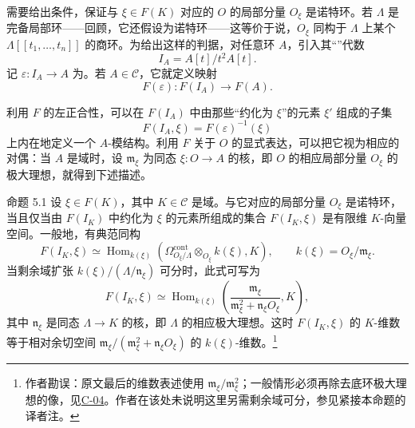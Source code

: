 需要给出条件，保证与 $\xi\in F(K)$ 对应的 $O$ 的局部分量 $O_\xi$ 是诺特环。若 $\Lambda$ 是完备局部环——回顾，它还假设为诺特环——这等价于说，$O_\xi$ 同构于 $\Lambda$ 上某个 $\Lambda[[t_1,\ldots,t_n]]$ 的商环。为给出这样的判据，对任意环 $A$，引入其“”代数
\[
 I_A=A[t]/t^2A[t].
\]
记 $\varepsilon:I_A\to A$ 为。若 $A\in\mathcal C$，它就定义映射
\[
 F(\varepsilon):F(I_A)\longrightarrow F(A).
\]

利用 $F$ 的左正合性，可以在 $F(I_A)$ 中由那些“约化为 $\xi$”的元素 $\xi'$ 组成的子集
\[
 F(I_A,\xi)=F(\varepsilon)^{-1}(\xi)
\]
上内在地定义一个 $A$-模结构。利用 $F$ 关于 $O$ 的显式表达，可以把它视为相应的对偶：当 $A$ 是域时，设 $\mathfrak m_\xi$ 为同态 $\xi:O\to A$ 的核，即 $O$ 的相应局部分量 $O_\xi$ 的极大理想，就得到下述描述。
\begin{statement}{命题 5.1}
设 $\xi\in F(K)$，其中 $K\in\mathcal C$ 是域。与它对应的局部分量 $O_\xi$ 是诺特环，当且仅当由 $F(I_K)$ 中约化为 $\xi$ 的元素所组成的集合 $F(I_K,\xi)$ 是有限维 $K$-向量空间。一般地，有典范同构
\[
 F(I_K,\xi)\simeq
 \operatorname{Hom}_{k(\xi)}\!\left(
 \Omega^{\mathrm{cont}}_{O_\xi/\Lambda}\otimes_{O_\xi}k(\xi),K\right),
 \qquad k(\xi)=O_\xi/\mathfrak m_\xi.
\]
当剩余域扩张 $k(\xi)/(\Lambda/\mathfrak n_\xi)$ 可分时，此式可写为
\[
 F(I_K,\xi)\simeq
 \operatorname{Hom}_{k(\xi)}\!\left(
 \frac{\mathfrak m_\xi}{\mathfrak m_\xi^2+\mathfrak n_\xi O_\xi},K\right),
\]
其中 $\mathfrak n_\xi$ 是同态 $\Lambda\to K$ 的核，即 $\Lambda$ 的相应极大理想。这时 $F(I_K,\xi)$ 的 $K$-维数等于相对余切空间 $\mathfrak m_\xi/(\mathfrak m_\xi^2+\mathfrak n_\xi O_\xi)$ 的 $k(\xi)$-维数。\footnote{作者勘误：原文最后的维数表述使用 $\mathfrak m_\xi/\mathfrak m_\xi^2$；一般情形必须再除去底环极大理想的像，见\hyperref[orig:6]{C-04}。作者在该处未说明这里另需剩余域可分，参见紧接本命题的译者注。}
\end{statement}
